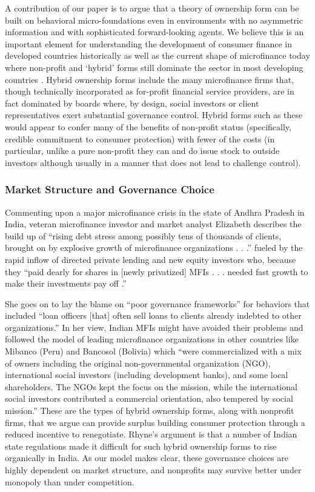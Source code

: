 \documentclass[11pt,english]{article}
\theoremstyle{plain}
\theoremstyle{definition}
\begin{document}
A contribution of our paper is to argue that a theory of ownership
form can be built on behavioral micro-foundations even in environments
with no asymmetric information and with sophisticated forward-looking
agents. We believe this is an important element for understanding
the development of consumer finance in developed countries historically
as well as the current shape of microfinance today where non-profit
and `hybrid' forms still dominate the sector in most developing countries
\citep{cull2009,conning2011}. Hybrid
ownership forms include the many microfinance firms that, though technically
incorporated as for-profit financial service providers, are in fact
dominated by boards where, by design, social investors or client representatives
exert substantial governance control. Hybrid forms such as these would
appear to confer many of the benefits of non-profit status (specifically,
credible commitment to consumer protection) with fewer of the costs
(in particular, unlike a pure non-profit they can and do issue stock
to outside investors although usually in a manner that does not lead
to challenge control).

\subsubsection{Market Structure and Governance Choice}

Commenting upon a major microfinance crisis in the state of Andhra
Pradesh in India, veteran microfinance investor and market analyst
Elizabeth \citet{rhyne2011} describes the build up
of ``rising debt stress among possibly tens of thousands of clients,
brought on by explosive growth of microfinance organizations . . .\textquotedblright{}
fueled by the rapid inflow of directed private lending and new equity
investors who, because they ``paid dearly for shares in {[}newly
privatized{]} MFIs . . . needed fast growth to make their investments
pay off .\textquotedblright{}

She goes on to lay the blame on ``poor governance frameworks\textquotedblright{}
for behaviors that included ``loan officers {[}that{]} often sell
loans to clients already indebted to other organizations.'' In her
view, Indian MFIs might have avoided their problems and followed the
model of leading microfinance organizations in other countries like
Mibanco (Peru) and Bancosol (Bolivia) which ``were commercialized
with a mix of owners including the original non-governmental organization
(NGO), international social investors (including development banks),
and some local shareholders. The NGOs kept the focus on the mission,
while the international social investors contributed a commercial
orientation, also tempered by social mission.'' These are the types
of hybrid ownership forms, along with nonprofit firms, that we argue
can provide surplus building consumer protection through a reduced
incentive to renegotiate. Rhyne's argument is that a number of Indian
state regulations made it difficult for such hybrid ownership forms
to rise organically in India. As our model makes clear, these governance
choices are highly dependent on market structure, and nonprofits may
survive better under monopoly than under competition.
\end{document}
